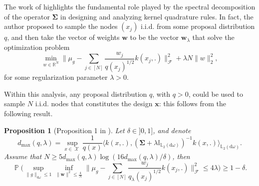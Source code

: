 \documentclass[twoside,11pt]{book}
\newtheorem{proposition}{Proposition}
\DeclareMathOperator{\Prb}{\mathbb{P}}
\DeclareMathOperator{\X}{\mathcal{X}}
\begin{document}
The work of \cite{Bac17} highlights the fundamental role played by the spectral decomposition of the operator $\bm{\Sigma}$ in designing and analyzing kernel quadrature rules.
In fact, the author proposed to sample the nodes $(x_j)$ i.i.d. from some proposal distribution $q$, and then take the vector of weights $\bm{w}$ to be the vector $\bm{w}_{\lambda}$ that solve the optimization problem
\begin{equation}\label{eq:reg_kernel_opt_problem}
\min\limits_{w \in \mathbb{R}^{N}} \Big\| \mu_{g} - \sum\limits_{j \in [N]} \frac{w_{j}}{q(x_{j})^{1/2}} k(x_{j},.) \Big\|_{\mathcal{F}}^{2} + \lambda N \|w\|_{2}^{2},
\end{equation}
for some regularization parameter $\lambda>0$. 



 


Within this analysis, any proposal distribution $q$, with $q>0$, could be used to sample $N$ i.i.d. nodes that constitutes the design $\bm{x}$: this follows from the following result.

\begin{proposition}[Proposition 1 in \cite{Bac17}]
\label{p:bach_general_proposal}
Let $\delta \in ]0,1]$, and denote
\begin{equation}
d_{\max}(q,\lambda) = \sup\limits_{x \in \X} \frac{1}{q(x)} \langle k(x,.), (\bm{\Sigma}+\lambda \mathbb{I}_{\mathbb{L}_{2}(\mathrm{d}\omega)})^{-1}k(x,.) \rangle_{\mathbb{L}_{2}(\mathrm{d}\omega)}.
\end{equation}
Assume that $N \geq 5 d_{\max}(q,\lambda) \log(16 d_{\max}(q,\lambda) / \delta)$, then
\begin{equation}
\Prb \bigg( \sup\limits_{\|g\|_{\mathrm{d}\omega} \leq 1} \inf\limits_{\|\bm{w}\|^{2}\leq \frac{4}{N}} \Big\| \mu_{g} - \sum\limits_{j \in [N]} \frac{w_{j}}{q_\lambda(x_{j})^{1/2}} k(x_{j},.)\Big\|_{\mathcal{F}}^{2} \leq 4\lambda \bigg) \geq 1- \delta .
\end{equation}
\end{proposition}
\end{document}
